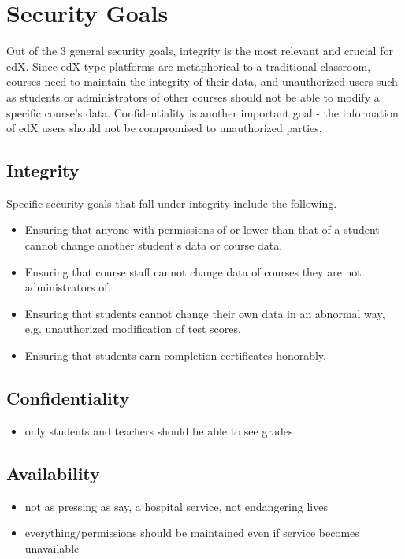 \documentclass[11pt]{article}
\begin{document}
\section{Security Goals}
Out of the 3 general security goals, integrity is the most relevant and crucial for edX. Since edX-type platforms are metaphorical to a traditional classroom, courses need to maintain the integrity of their data, and unauthorized users such as students or administrators of other courses should not be able to modify a specific course's data. Confidentiality is another important goal - the information of edX users should not be compromised to unauthorized parties.

\subsection{Integrity}
Specific security goals that fall under integrity include the following.
\begin{itemize}
\item Ensuring that anyone with permissions of or lower than that of a student cannot change another student's data or course data.
\item Ensuring that course staff cannot change data of courses they are not administrators of.
\item Ensuring that students cannot change their own data in an abnormal way, e.g. unauthorized modification of test scores.
\item Ensuring that students earn completion certificates honorably.
\end{itemize}

\subsection{Confidentiality}
\begin{itemize}
\item only students and teachers should be able to see grades
\end{itemize}

\subsection{Availability}
\begin{itemize}
\item not as pressing as say, a hospital service, not endangering lives
\item everything/permissions should be maintained even if service becomes unavailable
\end{itemize}
\end{document}
